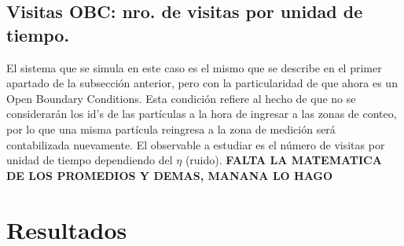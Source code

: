 \documentclass[11pt]{article}
\begin{document}
        \subsection{Visitas OBC: nro. de visitas por unidad de tiempo.}
            El sistema que se simula en este caso es el mismo que se describe en el primer apartado de la subsección
            anterior, pero con la particularidad de que ahora es un Open Boundary Conditions. Esta condición refiere
            al hecho de que no se considerarán los id's de las partículas a la hora de ingresar a las zonas de conteo,
            por lo que una misma partícula reingresa a la zona de medición será contabilizada nuevamente.
            El observable a estudiar es el número de visitas por unidad de tiempo dependiendo del $\eta$ (ruido).
            \textbf{FALTA LA MATEMATICA DE LOS PROMEDIOS Y DEMAS, MANANA LO HAGO}


    \newpage

    \section{Resultados}
\end{document}
